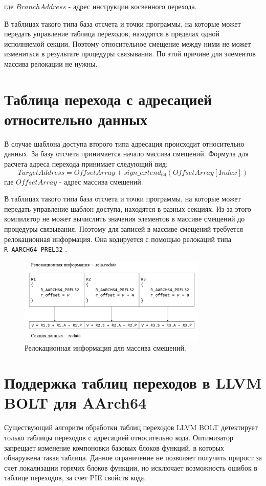 \documentclass{mipt-thesis-bs}
\begin{document}
    где $BranchAddress$ - адрес инструкции косвенного перехода.

    В таблицах такого типа база отсчета и точки программы, на которые может передать управление таблица переходов, находятся в пределах одной исполняемой секции. Поэтому относительное смещение между ними не может измениться в результате процедуры связывания. По этой причине для элементов массива релокации не нужны.

    \section{Таблица перехода с адресацией относительно данных}

    В случае шаблона доступа второго типа адресация происходит относительно данных. За базу отсчета принимается начало массива смещений. Формула для расчета адреса перехода принимает следующий вид:
    $$TargetAddress = OffsetArray + sign\_extend_{64}(OffsetArray[Index])$$
    где $OffsetArray$ - адрес массива смещений.

    В таблицах такого типа база отсчета и точки программы, на которые может передать управление шаблон доступа, находятся в разных секциях. Из-за этого компилятор не может вычислить значения элементов в массиве смещений до процедуры связывания. Поэтому для записей в массиве смещений требуется релокационная информация. Она кодируется с помощью релокаций типа \verb|R_AARCH64_PREL32| .

    \begin{figure}[h!]
        \centering
        \includegraphics[width=0.8\textwidth]{pics/Relocations.png}
        \caption{Релокационная информация для массива смещений.}
        \label{fig:rodata_reloc}
    \end{figure}


    \section{Поддержка таблиц переходов в LLVM BOLT для AArch64}
    Существующий алгоритм обработки таблиц переходов LLVM BOLT детектирует только таблицы переходов с адресацией относительно кода. Оптимизатор запрещает изменение компоновки базовых блоков функций, в которых обнаружена такая таблица. Данное ограничение не позволяет получить прирост за счет локализации горячих блоков функции, но исключает возможность ошибок в таблице переходов, за счет PIE свойств кода.
\end{document}
